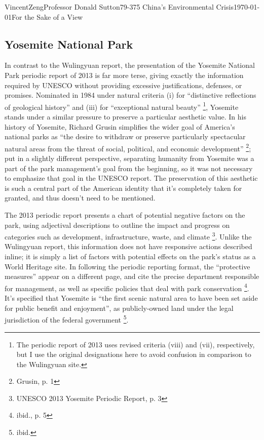 \documentclass[12pt]{article}
\begin{document}
\begin{mla}{Vincent}{Zeng}{Professor Donald Sutton}{79-375 China's Environmental Crisis}{\today}{For the Sake of a View}
\subsection*{Yosemite National Park}

In contrast to the Wulingyuan report, the presentation of the Yosemite National
Park periodic report of 2013 is far more terse, giving exactly the information
required by UNESCO without providing excessive justifications, defenses, or
promises. Nominated in 1984 under natural criteria (i) for ``distinctive
reflections of geological history'' and (iii) for ``exceptional natural
beauty'' \footnote{The periodic report of 2013 uses revised criteria (viii) and
  (vii), respectively, but
I use the original designations here to avoid confusion in comparison to the
Wulingyuan site.}, Yosemite stands under a similar pressure to preserve a
particular aesthetic value. In his
history of Yosemite, Richard Grusin simplifies the wider goal of America's
national parks as ``the desire to withdraw or preserve particularly spectacular
natural areas from the threat of social, political, and economic development''
\footnote{Grusin, p. 1}; put in a slightly different perspective, separating
humanity from Yosemite was a part of the park management's goal from the
beginning, so it was not necessary to emphasize that goal in the UNESCO
report. The preservation of this aesthetic is such a central part of the
American identity that it's completely taken for granted, and thus doesn't need
to be mentioned.

The 2013 periodic report presents a chart of potential negative factors on the
park, using adjectival descriptions to outline the impact and progress on
categories such as development, infrastructure, waste, and climate
\footnote{UNESCO 2013 Yosemite Periodic Report, p. 3}. Unlike the Wulingyuan
report, this information does not have responsive actions described inline; it
is simply a list of factors with potential effects on the park's status as a
World Heritage site. In following the periodic reporting format, the
``protective measures'' appear on a different page, and cite the precise
department responsible for management, as well as specific policies that deal with
park conservation \footnote{ibid., p. 5}. It's specified that Yosemite is ``the
first scenic natural area to have been set aside for public benefit and
enjoyment'', as publicly-owned land under the legal jurisdiction of the federal
government \footnote{ibid.}.


\end{mla}
\end{document}
